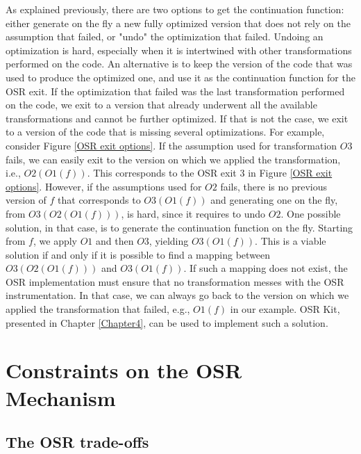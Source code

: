 As explained previously, there are two options to get the continuation function: either generate on the fly a new fully optimized version that does not rely on the assumption that failed, or "undo" the optimization that failed.
Undoing an optimization is hard, especially when it is intertwined with other transformations performed on the code.
An alternative is to keep the version of the code that was used to produce the optimized one, and use it as the continuation function for the OSR exit.
If the optimization that failed was the last transformation performed on the code, we exit to a version that already underwent all the available transformations and cannot be further optimized.
If that is not the case, we exit to a version of the code that is missing several optimizations.
For example, consider Figure \ref{OSR exit options}. 
If the assumption used for transformation $O3$ fails, we can easily exit to the version on which we applied the transformation, i.e., $O2(O1(f))$.
This corresponds to the OSR exit 3 in Figure \ref{OSR exit options}.
However, if the assumptions used for $O2$ fails, there is no previous version of $f$ that corresponds to $O3(O1(f))$ and generating one on the fly, from $O3(O2(O1(f)))$, is hard, since it requires to undo $O2$.
One possible solution, in that case, is to generate the continuation function on the fly.
Starting from $f$, we apply $O1$ and then $O3$, yielding $O3(O1(f))$.
This is a viable solution if and only if it is possible to find a mapping between $O3(O2(O1(f)))$ and $O3(O1(f))$.
If such a mapping does not exist, the OSR implementation must ensure that no transformation messes with the OSR instrumentation.
In that case, we can always go back to the version on which we applied the transformation that failed, e.g., $O1(f)$ in our example.
OSR Kit, presented in Chapter \ref{Chapter4}, can be used to implement such a solution.\\

\section{Constraints on the OSR Mechanism}
\subsection{The OSR trade-offs}\label{tradeOffs}

